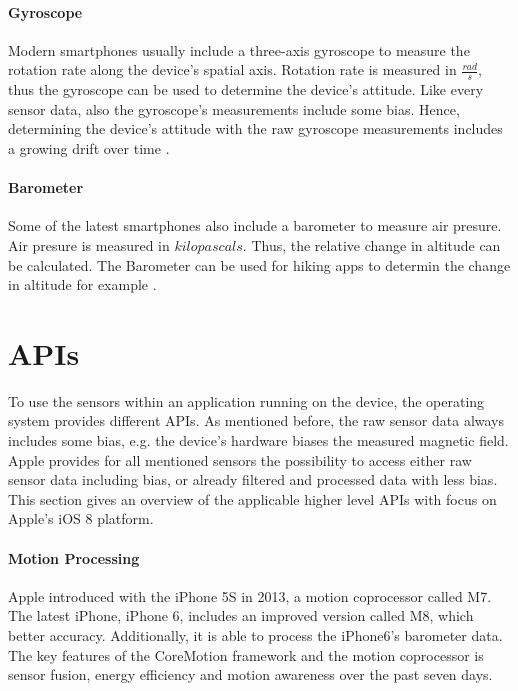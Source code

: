 \paragraph{Gyroscope}

Modern smartphones usually include a three-axis gyroscope to measure the rotation rate along the device's spatial axis.
Rotation rate is measured in $\frac{rad}{s}$, thus the gyroscope can be used to determine the device's attitude.
Like every sensor data, also the gyroscope's measurements include some bias.
Hence, determining the device's attitude with the raw gyroscope measurements includes a growing drift over time \cite{ios_cm, wwdc_2012}.


\paragraph{Barometer}

Some of the latest smartphones also include a barometer to measure air presure.
Air presure is measured in $kilopascals$.
Thus, the relative change in altitude can be calculated.
The Barometer can be used for hiking apps to determin the change in altitude for example \cite{ios_cm}.


\section{\acsp{API}}

To use the sensors within an application running on the device, the operating system provides different \acsp{API}.
As mentioned before, the raw sensor data always includes some bias, e.g. the device's hardware biases the measured magnetic field.
Apple provides for all mentioned sensors the possibility to access either raw sensor data including bias, or already filtered and processed data with less bias.
This section gives an overview of the applicable higher level \acsp{API} with focus on Apple's iOS 8 platform.


\paragraph{Motion Processing}

Apple introduced with the iPhone 5S in 2013, a motion coprocessor called M7.
The latest iPhone, iPhone 6, includes an improved version called M8, which better accuracy. Additionally, it is able to process the iPhone6's barometer data.
The key features of the CoreMotion framework and the motion coprocessor is sensor fusion, energy efficiency and motion awareness over the past seven days.

